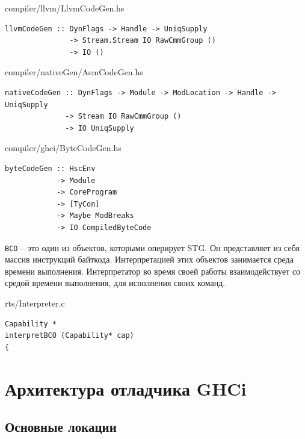 \documentclass[fontsize=14pt, paper=a4, pagesize, DIV=calc]{scrartcl}
\def\code#1{\texttt{#1}}
\begin{document}
\begin{ListingEnv}
\caption{compiler/llvm/LlvmCodeGen.hs}
\begin{lstlisting}[firstnumber=44]
llvmCodeGen :: DynFlags -> Handle -> UniqSupply
               -> Stream.Stream IO RawCmmGroup ()
               -> IO ()
\end{lstlisting}
\end{ListingEnv}

\begin{ListingEnv}
\caption{compiler/nativeGen/AsmCodeGen.hs}
\begin{lstlisting}[firstnumber=108]
nativeCodeGen :: DynFlags -> Module -> ModLocation -> Handle -> UniqSupply
              -> Stream IO RawCmmGroup ()
              -> IO UniqSupply
\end{lstlisting}
\end{ListingEnv}

\begin{ListingEnv}
\caption{compiler/ghci/ByteCodeGen.hs}
\begin{lstlisting}[firstnumber=81]
byteCodeGen :: HscEnv
            -> Module
            -> CoreProgram
            -> [TyCon]
            -> Maybe ModBreaks
            -> IO CompiledByteCode
\end{lstlisting}
\end{ListingEnv}

\code{BCO} -- это один из объектов, которыми оперирует STG. Он представляет из
себя массив инструкций байткода. Интерпретацией этих объектов занимается среда
времени выполнения. Интерпретатор во время своей работы взаимодействует со
средой времени выполнения, для исполнения своих команд.

\begin{ListingEnv}
\caption{rts/Interpreter.c}
\begin{lstlisting}[firstnumber=295]
Capability *
interpretBCO (Capability* cap)
{
\end{lstlisting}
\end{ListingEnv}

\section{Архитектура отладчика GHCi}


\subsection{Основные локации}
\end{document}
